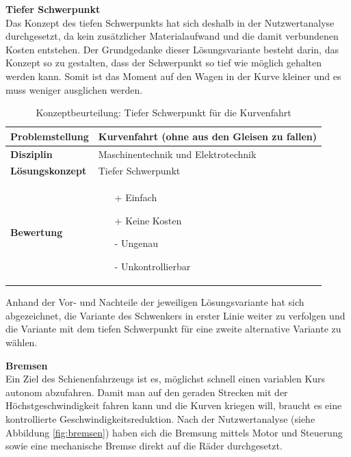 \documentclass[../../../main.tex]{subfiles}
\begin{document}
    \textbf{Tiefer Schwerpunkt}\\
    Das Konzept des tiefen Schwerpunkts hat sich deshalb in der Nutzwertanalyse durchgesetzt, da kein zusätzlicher Materialaufwand und die damit verbundenen Kosten entstehen. Der Grundgedanke dieser Lösungsvariante besteht darin, das Konzept so zu gestalten, dass der Schwerpunkt so tief wie möglich gehalten werden kann. Somit ist das Moment auf den Wagen in der Kurve kleiner und es muss weniger ausglichen werden.

    \begin{flushleft}
        \begin{table}[h]
        \begin{tabular}{ | l | p{11cm} |}
        \hline
        \textbf{Problemstellung} & Kurvenfahrt (ohne aus den Gleisen zu fallen) \\ \hline
        \textbf{Disziplin} & Maschinentechnik und Elektrotechnik \\ \hline
        \textbf{Lösungskonzept} & Tiefer Schwerpunkt \\ \hline
        \textbf{Bewertung} &  \begin{itemize}
                                \item[+] Einfach
                                \item[+] Keine Kosten
                                \item[-] Ungenau 
                                \item[-] Unkontrollierbar 
                              \end{itemize} \\ \hline
        \end{tabular}
        \caption{Konzeptbeurteilung: Tiefer Schwerpunkt für die Kurvenfahrt}
        \label{tab:tieferschwerpunkt}
    \end{table}
    \end{flushleft}

    Anhand der Vor- und Nachteile der jeweiligen Lösungsvariante hat sich abgezeichnet, die Variante des Schwenkers in erster Linie weiter zu verfolgen und die Variante mit dem tiefen Schwerpunkt für eine zweite alternative Variante zu wählen.
    
    \textbf{Bremsen}\\
    Ein Ziel des Schienenfahrzeugs ist es, möglichst schnell einen variablen Kurs autonom abzufahren. Damit man auf den geraden Strecken mit der Höchstgeschwindigkeit fahren kann und die Kurven kriegen will, braucht es eine kontrollierte Geschwindigkeitsreduktion. Nach der Nutzwertanalyse (siehe Abbildung \ref{fig:bremsen}) haben sich die Bremsung mittels Motor und Steuerung sowie eine mechanische Bremse direkt auf die Räder durchgesetzt.
\end{document}
